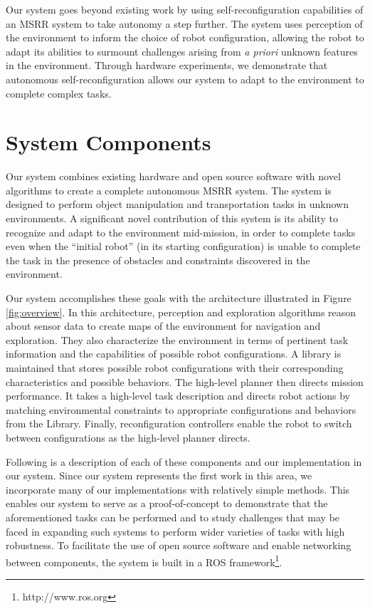 \documentclass[conference]{IEEEtran}
\begin{document}
Our system goes beyond existing work by using self-reconfiguration capabilities of an MSRR system to take autonomy a step further.  The system uses perception of the environment to inform the choice of robot configuration, allowing the robot to adapt its abilities to surmount challenges arising from \textit{a priori} unknown features in the environment. Through hardware experiments, we demonstrate that autonomous self-reconfiguration allows our system to adapt to the environment to complete complex tasks.

\section{System Components}

Our system combines existing hardware and open source software with novel algorithms to create a complete autonomous MSRR system. The system is designed to perform object manipulation and transportation tasks in unknown environments. A significant novel contribution of this system is its ability to recognize and adapt to the environment mid-mission, in order to complete tasks even when the ``initial robot'' (in its starting configuration) is unable to complete the task in the presence of obstacles and constraints discovered in the environment.

Our system accomplishes these goals with the architecture illustrated in Figure \ref{fig:overview}. In this architecture, perception and exploration algorithms reason about sensor data to create maps of the environment for navigation and exploration. They also characterize the environment in terms of pertinent task information and the capabilities of possible robot configurations. A library is maintained that stores possible robot configurations with their corresponding characteristics and possible behaviors. The high-level planner then directs mission performance. It takes a high-level task description and directs robot actions by matching environmental constraints to appropriate configurations and behaviors from the Library. Finally, reconfiguration controllers enable the robot to switch between configurations as the high-level planner directs.

Following is a description of each of these components and our implementation in our system. Since our system represents the first work in this area, we incorporate many of our implementations with relatively simple methods. This enables our system to serve as a proof-of-concept to demonstrate that the aforementioned tasks can be performed and to study challenges that may be faced in expanding such systems to perform wider varieties of tasks with high robustness. To facilitate the use of open source software and enable networking between components, the system is built in a ROS framework\footnote{http://www.ros.org}.
\end{document}
